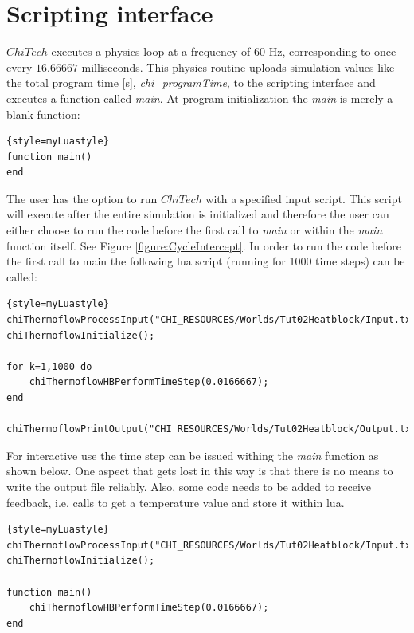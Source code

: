 \documentclass[11pt,letterpaper,titlepage]{article}
\begin{document}
\section{Scripting interface}
$ChiTech$ executes a physics loop at a frequency of 60 Hz, corresponding to once every $16.66667$ milliseconds. This physics routine uploads simulation values like the total program time [s], \textit{chi\_programTime}, to the scripting interface and executes a function called \textit{main}. At program initialization the \textit{main} is merely a blank function:
\newline
\begin{lstlisting}{style=myLuastyle}
function main()
end
\end{lstlisting}
\vspace{0.3cm}
\noindent
The user has the option to run $ChiTech$ with a specified input script. This script will execute after the entire simulation is initialized and therefore the user can either choose to run the code before the first call to \textit{main} or within the \textit{main} function itself. See Figure \ref{figure:CycleIntercept}. In order to run the code before the first call to main the following lua script (running for 1000 time steps) can be called:
\newline
\begin{lstlisting}{style=myLuastyle}
chiThermoflowProcessInput("CHI_RESOURCES/Worlds/Tut02Heatblock/Input.txt");
chiThermoflowInitialize();

for k=1,1000 do
    chiThermoflowHBPerformTimeStep(0.0166667);
end

chiThermoflowPrintOutput("CHI_RESOURCES/Worlds/Tut02Heatblock/Output.txt");
\end{lstlisting}
\vspace{0.3cm}
\noindent
For interactive use the time step can be issued withing the \textit{main} function as shown below. One aspect that gets lost in this way is that there is no means to write the output file reliably. Also, some code needs to be added to receive feedback, i.e. calls to get a temperature value and store it within lua.
\newline
\begin{lstlisting}{style=myLuastyle}
chiThermoflowProcessInput("CHI_RESOURCES/Worlds/Tut02Heatblock/Input.txt");
chiThermoflowInitialize();

function main()
    chiThermoflowHBPerformTimeStep(0.0166667);
end
\end{lstlisting}
\vspace{0.3cm}
\end{document}
